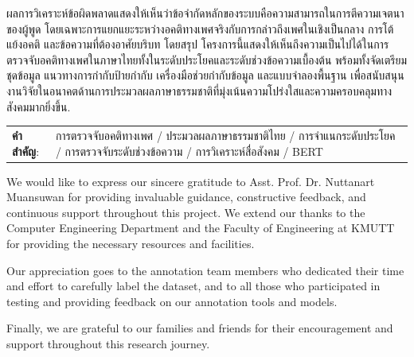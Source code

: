 \documentclass[12pt,oneside,openright,a4paper]{cpe-english-project}
\begin{document}
{ผลการวิเคราะห์ข้อผิดพลาดแสดงให้เห็นว่าข้อจำกัดหลักของระบบคือความสามารถในการตีความเจตนาของผู้พูด โดยเฉพาะการแยกแยะระหว่างอคติทางเพศจริงกับการกล่าวถึงเพศในเชิงเป็นกลาง การโต้แย้งอคติ และข้อความที่ต้องอาศัยบริบท โดยสรุป โครงการนี้แสดงให้เห็นถึงความเป็นไปได้ในการตรวจจับอคติทางเพศในภาษาไทยทั้งในระดับประโยคและระดับช่วงข้อความเบื้องต้น พร้อมทั้งจัดเตรียมชุดข้อมูล แนวทางการกำกับป้ายกำกับ เครื่องมือช่วยกำกับข้อมูล และแบบจำลองพื้นฐาน เพื่อสนับสนุนงานวิจัยในอนาคตด้านการประมวลผลภาษาธรรมชาติที่มุ่งเน้นความโปร่งใสและความครอบคลุมทางสังคมมากยิ่งขึ้น.

\begin{flushleft}
\begin{tabular*}{\textwidth}{@{}lp{}}
\textbf{\textthai{คำสำคัญ}}: & การตรวจจับอคติทางเพศ / ประมวลผลภาษาธรรมชาติไทย / การจำแนกระดับประโยค / การตรวจจับระดับช่วงข้อความ / การวิเคราะห์สื่อสังคม / BERT
\end{tabular*}
\end{flushleft}
\endabstract
}

\preface

We would like to express our sincere gratitude to Asst. Prof. Dr. Nuttanart Muansuwan for providing invaluable guidance, constructive feedback, and continuous support throughout this project. We extend our thanks to the Computer Engineering Department and the Faculty of Engineering at KMUTT for providing the necessary resources and facilities.

Our appreciation goes to the annotation team members who dedicated their time and effort to carefully label the dataset, and to all those who participated in testing and providing feedback on our annotation tools and models.

Finally, we are grateful to our families and friends for their encouragement and support throughout this research journey.

\tableofcontents
\listoftables
\listoffigures
\end{document}
